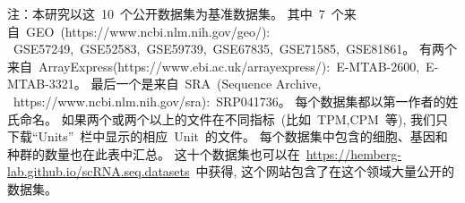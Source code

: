 \begin{table}[!htbp]
\begin{tablenotes}
        \item 注：本研究以这~10~个公开数据集为基准数据集。
        其中~7~个来自~GEO~(https://www.ncbi.nlm.nih.gov/geo/):\\~GSE57249,~GSE52583,~GSE59739,~GSE67835,~GSE71585,~GSE81861。
        有两个来自~ArrayExpress(https://www.ebi.ac.uk/arrayexpress/):~E-MTAB-2600,~E-MTAB-3321。
        最后一个是来自~SRA~(Sequence Archive,\\~https://www.ncbi.nlm.nih.gov/sra):~SRP041736。
        每个数据集都以第一作者的姓氏命名。
        如果两个或两个以上的文件在不同指标~(比如~TPM,CPM~等),
        我们只下载``Units”~栏中显示的相应~Unit~的文件。 
        每个数据集中包含的细胞、基因和种群的数量也在此表中汇总。
        这十个数据集也可以在~\url{https://hemberg-lab.github.io/scRNA.seq.datasets}~中获得,
        这个网站包含了在这个领域大量公开的数据集。
      \end{tablenotes}
    \end{table}

